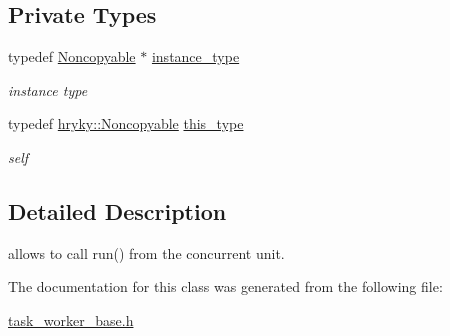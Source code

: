 \subsection*{Private Types}
\begin{DoxyCompactItemize}
\item 
\hypertarget{classhryky_1_1_noncopyable_aaf87abb55f700af85ecb0895f6178821}{typedef \hyperlink{classhryky_1_1_noncopyable}{Noncopyable} $\ast$ \hyperlink{classhryky_1_1_noncopyable_aaf87abb55f700af85ecb0895f6178821}{instance\-\_\-type}}\label{classhryky_1_1_noncopyable_aaf87abb55f700af85ecb0895f6178821}

\begin{DoxyCompactList}\small\item\em instance type \end{DoxyCompactList}\item 
\hypertarget{classhryky_1_1_noncopyable_acf13ad1c98a76247a561dff514979da5}{typedef \hyperlink{classhryky_1_1_noncopyable}{hryky\-::\-Noncopyable} \hyperlink{classhryky_1_1_noncopyable_acf13ad1c98a76247a561dff514979da5}{this\-\_\-type}}\label{classhryky_1_1_noncopyable_acf13ad1c98a76247a561dff514979da5}

\begin{DoxyCompactList}\small\item\em self \end{DoxyCompactList}\end{DoxyCompactItemize}


\subsection{Detailed Description}
allows to call run() from the concurrent unit. 

The documentation for this class was generated from the following file\-:\begin{DoxyCompactItemize}
\item 
\hyperlink{task__worker__base_8h}{task\-\_\-worker\-\_\-base.\-h}\end{DoxyCompactItemize}
